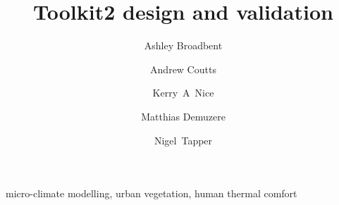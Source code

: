 \documentclass[final,3p,times,authoryear]{elsarticle}
\begin{document}
\begin{frontmatter}



\title{Toolkit2 design and validation}


\author[monash,crc]{Ashley Broadbent}
\author[monash,crc]{Andrew Coutts}
\author[monash,crc]{Kerry~A~Nice}
\author[ku,crc]{Matthias Demuzere}
\author[monash,crc]{Nigel~Tapper}
\address[monash]{School of Earth, Atmosphere and Environment, Monash University, Clayton, VIC 3800, Australia}
\address[crc]{Cooperative Research Centre for Water Sensitive Cities, Melbourne, Australia}
\address[ku]{KU Leuven, Department of Earth and Environmental Sciences, Celestijnenlaan 200E, 3001 Leuven, Belgium}

\begin{abstract}



\end{abstract}

\begin{keyword}
micro-climate modelling, urban vegetation, human thermal comfort



\end{keyword}

\end{frontmatter}
\end{document}
